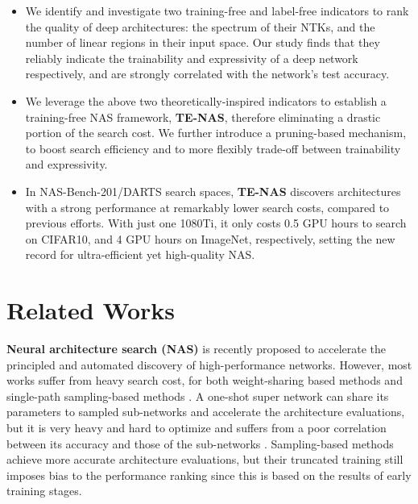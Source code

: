 \documentclass{article} \usepackage{iclr2021_conference,times}
\begin{document}
\vspace{-0.5em}
\begin{itemize}[leftmargin=*]
    \item We identify and investigate two training-free and label-free indicators to rank the quality of deep architectures: the spectrum of their NTKs, and the number of linear regions in their input space. Our study finds that they reliably indicate the trainability and expressivity of a deep network respectively, and are strongly correlated with the network's test accuracy.
    \item We leverage the above two theoretically-inspired indicators to establish a training-free NAS framework, \textbf{TE-NAS}, therefore eliminating a drastic portion of the search cost. We further introduce a pruning-based mechanism, to boost search efficiency and to more flexibly trade-off between trainability and expressivity. 
    \item In NAS-Bench-201/DARTS search spaces, \textbf{TE-NAS} discovers architectures with a strong performance at remarkably lower search costs, compared to previous efforts. With just one 1080Ti, it only costs 0.5 GPU hours to search on CIFAR10, and 4 GPU hours on ImageNet, respectively, setting the new record for ultra-efficient yet high-quality NAS.
\end{itemize}\vspace{-1em}


\section{Related Works}\label{sec:related_works}\vspace{-0.5em}
\textbf{Neural architecture search (NAS)} is recently proposed to accelerate the principled and automated discovery of high-performance networks. However, most works suffer from heavy search cost, for both weight-sharing based methods \citep{liu2018darts,dong2019searching,liu2019auto,yu2020bignas,li2020sgas,Yang_2020_CVPR} and single-path sampling-based methods \citep{pham2018efficient,guo2019single,real2019regularized,tan2020efficientdet,li2020gp,yang2020hournas}. A one-shot super network can share its parameters to sampled sub-networks and accelerate the architecture evaluations, but it is very heavy and hard to optimize and suffers from a poor correlation between its accuracy and those of the sub-networks \citep{yu2020evaluating}. Sampling-based methods achieve more accurate architecture evaluations, but their truncated training still imposes bias to the performance ranking since this is based on the results of early training stages.
\end{document}
